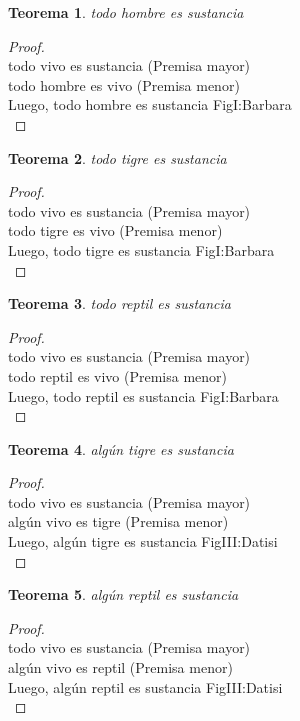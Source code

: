 ﻿\documentclass[12pt]{book}
\newtheorem{theorem}{Teorema}[chapter]
\newtheorem{proof}{Demostración}
\begin{document}
\begin{theorem}
todo hombre es sustancia
\label{th: 51}
\end{theorem}\begin{proof}\\todo vivo es sustancia	 (Premisa mayor) \\todo hombre es vivo	 (Premisa menor) \\Luego, todo hombre es sustancia	FigI:Barbara \\ \end{proof}
\begin{theorem}
todo tigre es sustancia
\label{th: 52}
\end{theorem}\begin{proof}\\todo vivo es sustancia	 (Premisa mayor) \\todo tigre es vivo	 (Premisa menor) \\Luego, todo tigre es sustancia	FigI:Barbara \\ \end{proof}
\begin{theorem}
todo reptil es sustancia
\label{th: 53}
\end{theorem}\begin{proof}\\todo vivo es sustancia	 (Premisa mayor) \\todo reptil es vivo	 (Premisa menor) \\Luego, todo reptil es sustancia	FigI:Barbara \\ \end{proof}
\begin{theorem}
algún tigre es sustancia
\label{th: 54}
\end{theorem}\begin{proof}\\todo vivo es sustancia	 (Premisa mayor) \\algún vivo es tigre	 (Premisa menor) \\Luego, algún tigre es sustancia	FigIII:Datisi \\ \end{proof}
\begin{theorem}
algún reptil es sustancia
\label{th: 55}
\end{theorem}\begin{proof}\\todo vivo es sustancia	 (Premisa mayor) \\algún vivo es reptil	 (Premisa menor) \\Luego, algún reptil es sustancia	FigIII:Datisi \\ \end{proof}
\end{document}
